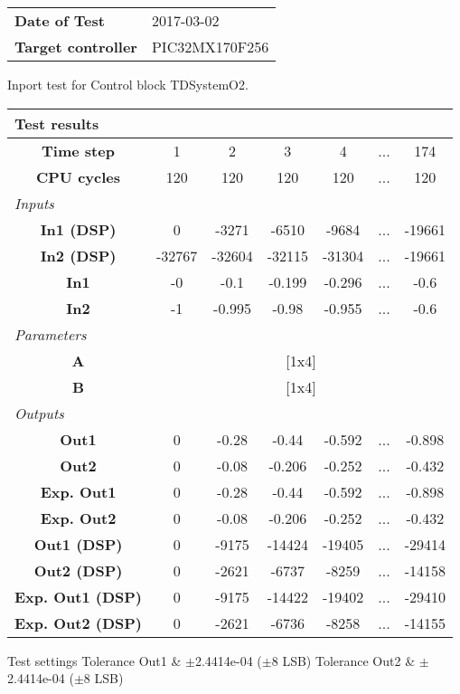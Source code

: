 \begin{tabular}{l l}
\textbf{Date of Test} & 2017-03-02 \tabularnewline
\textbf{Target controller} & PIC32MX170F256 \tabularnewline
\end{tabular}
\vspace{1ex}
Inport test for Control block TDSystemO2.

\vspace{1em}
\begin{tabularx}{\textwidth}{|c|c|c|c|c|>{\centering\arraybackslash}X|c|}
\hline
\multicolumn{7}{|l|}{\cellcolor[gray]{0.8}\textbf{Test results}} \tabularnewline \hline
\textbf{Time step} & 1 & 2 & 3 & 4 & ... & 174 \tabularnewline \hline
\textbf{CPU cycles} & 120 & 120 & 120 & 120 & ... & 120 \tabularnewline \hline
\multicolumn{7}{|l|}{\cellcolor[gray]{0.9}\textit{Inputs}} \tabularnewline \hline
\textbf{In1 (DSP)} & 0 & -3271 & -6510 & -9684 & ... & -19661 \tabularnewline \hline
\textbf{In2 (DSP)} & -32767 & -32604 & -32115 & -31304 & ... & -19661 \tabularnewline \hline
\textbf{In1} & -0 & -0.1 & -0.199 & -0.296 & ... & -0.6 \tabularnewline \hline
\textbf{In2} & -1 & -0.995 & -0.98 & -0.955 & ... & -0.6 \tabularnewline \hline
\multicolumn{7}{|l|}{\cellcolor[gray]{0.9}\textit{Parameters}} \tabularnewline \hline
\textbf{A} & \multicolumn{6}{c|}{[1x4]} \tabularnewline \hline
\textbf{B} & \multicolumn{6}{c|}{[1x4]} \tabularnewline \hline
\multicolumn{7}{|l|}{\cellcolor[gray]{0.9}\textit{Outputs}} \tabularnewline \hline
\textbf{Out1} & 0 & -0.28 & -0.44 & -0.592 & ... & -0.898 \tabularnewline \hline
\textbf{Out2} & 0 & -0.08 & -0.206 & -0.252 & ... & -0.432 \tabularnewline \hline
\textbf{Exp. Out1} & 0 & -0.28 & -0.44 & -0.592 & ... & -0.898 \tabularnewline \hline
\textbf{Exp. Out2} & 0 & -0.08 & -0.206 & -0.252 & ... & -0.432 \tabularnewline \hline
\textbf{Out1 (DSP)} & 0 & -9175 & -14424 & -19405 & ... & -29414 \tabularnewline \hline
\textbf{Out2 (DSP)} & 0 & -2621 & -6737 & -8259 & ... & -14158 \tabularnewline \hline
\textbf{Exp. Out1 (DSP)} & 0 & -9175 & -14422 & -19402 & ... & -29410 \tabularnewline \hline
\textbf{Exp. Out2 (DSP)} & 0 & -2621 & -6736 & -8258 & ... & -14155 \tabularnewline \hline
\end{tabularx}
\vspace{1ex}

\begin{XtoCtabular}{Test settings}
Tolerance Out1 & $\pm$2.4414e-04 ($\pm$8 LSB) \tabularnewline \hline
Tolerance Out2 & $\pm$2.4414e-04 ($\pm$8 LSB) \tabularnewline \hline
\end{XtoCtabular}

